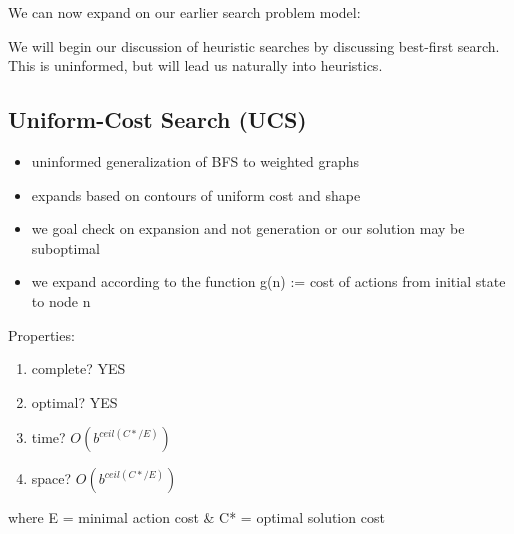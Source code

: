 \documentclass[../../lecture_notes.tex]{subfiles}
\begin{document}
\noindent We can now expand on our earlier search problem model:

\begin{center}  \end{center} \medskip

\noindent We will begin our discussion of heuristic searches by discussing best-first search.\\
This is uninformed, but will lead us naturally into heuristics.

\subsection*{Uniform-Cost Search (UCS)}
\begin{itemize} [itemsep=0mm]
	\item uninformed generalization of BFS to weighted graphs
	\item expands based on contours of uniform cost and shape
	\item we goal check on expansion and not generation or our solution may be suboptimal
	\item we expand according to the function g(n) := cost of actions from initial state to node n
\end{itemize}
\noindent Properties:
	\begin{enumerate} [itemsep=0mm]
		\item complete? YES
		\item optimal? YES
		\item time? $O(b^{ceil(C*/E)})$
		\item space?  $O(b^{ceil(C*/E)})$
	\end{enumerate}
	where E = minimal action cost \& C* = optimal solution cost
\end{document}
